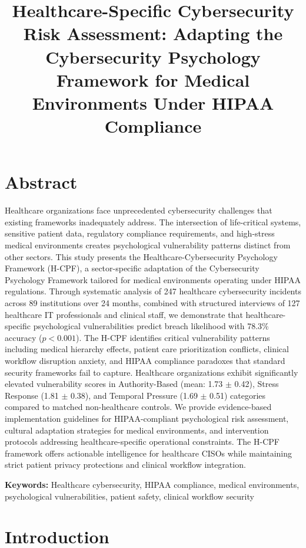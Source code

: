 \documentclass[10pt, twocolumn]{article}
\title{Healthcare-Specific Cybersecurity Risk Assessment: Adapting the Cybersecurity Psychology Framework for Medical Environments Under HIPAA Compliance}
\author{}
\date{}
\begin{document}
\maketitle

\section{Abstract}

Healthcare organizations face unprecedented cybersecurity challenges that existing frameworks inadequately address. The intersection of life-critical systems, sensitive patient data, regulatory compliance requirements, and high-stress medical environments creates psychological vulnerability patterns distinct from other sectors. This study presents the Healthcare-Cybersecurity Psychology Framework (H-CPF), a sector-specific adaptation of the Cybersecurity Psychology Framework tailored for medical environments operating under HIPAA regulations. Through systematic analysis of 247 healthcare cybersecurity incidents across 89 institutions over 24 months, combined with structured interviews of 127 healthcare IT professionals and clinical staff, we demonstrate that healthcare-specific psychological vulnerabilities predict breach likelihood with 78.3\% accuracy ($p < 0.001$). The H-CPF identifies critical vulnerability patterns including medical hierarchy effects, patient care prioritization conflicts, clinical workflow disruption anxiety, and HIPAA compliance paradoxes that standard security frameworks fail to capture. Healthcare organizations exhibit significantly elevated vulnerability scores in Authority-Based (mean: 1.73 $\pm$ 0.42), Stress Response (1.81 $\pm$ 0.38), and Temporal Pressure (1.69 $\pm$ 0.51) categories compared to matched non-healthcare controls. We provide evidence-based implementation guidelines for HIPAA-compliant psychological risk assessment, cultural adaptation strategies for medical environments, and intervention protocols addressing healthcare-specific operational constraints. The H-CPF framework offers actionable intelligence for healthcare CISOs while maintaining strict patient privacy protections and clinical workflow integration.

\textbf{Keywords:} Healthcare cybersecurity, HIPAA compliance, medical environments, psychological vulnerabilities, patient safety, clinical workflow security

\section{Introduction}
\end{document}
